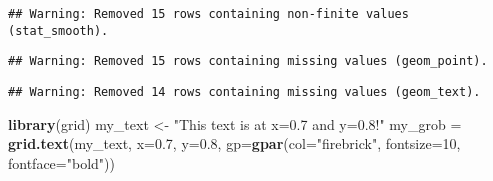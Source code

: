 \documentclass[]{article}
\newenvironment{Shaded}{\begin{snugshade}}{\end{snugshade}}
\newcommand{\KeywordTok}[1]{\textcolor[rgb]{0.13,0.29,0.53}{\textbf{#1}}}
\newcommand{\DataTypeTok}[1]{\textcolor[rgb]{0.13,0.29,0.53}{#1}}
\newcommand{\DecValTok}[1]{\textcolor[rgb]{0.00,0.00,0.81}{#1}}
\newcommand{\FloatTok}[1]{\textcolor[rgb]{0.00,0.00,0.81}{#1}}
\newcommand{\StringTok}[1]{\textcolor[rgb]{0.31,0.60,0.02}{#1}}
\newcommand{\OperatorTok}[1]{\textcolor[rgb]{0.81,0.36,0.00}{\textbf{#1}}}
\newcommand{\NormalTok}[1]{#1}
\begin{document}
\begin{Shaded}
\end{Shaded}

\begin{verbatim}
## Warning: Removed 15 rows containing non-finite values (stat_smooth).
\end{verbatim}

\begin{verbatim}
## Warning: Removed 15 rows containing missing values (geom_point).
\end{verbatim}

\begin{verbatim}
## Warning: Removed 14 rows containing missing values (geom_text).
\end{verbatim}

\begin{Shaded}
\begin{Highlighting}[]
\KeywordTok{library}\NormalTok{(grid)}
\NormalTok{my_text <-}\StringTok{ "This text is at x=0.7 and y=0.8!"}
\NormalTok{my_grob =}\StringTok{ }\KeywordTok{grid.text}\NormalTok{(my_text, }\DataTypeTok{x=}\FloatTok{0.7}\NormalTok{,  }\DataTypeTok{y=}\FloatTok{0.8}\NormalTok{, }\DataTypeTok{gp=}\KeywordTok{gpar}\NormalTok{(}\DataTypeTok{col=}\StringTok{"firebrick"}\NormalTok{, }\DataTypeTok{fontsize=}\DecValTok{10}\NormalTok{, }\DataTypeTok{fontface=}\StringTok{"bold"}\NormalTok{))}
\end{Highlighting}
\end{Shaded}
\end{document}
